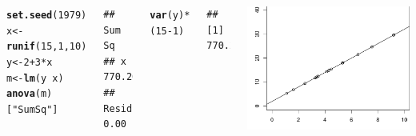\documentclass{beamer}\usepackage[]{graphicx}\usepackage[]{color}
\makeatletter
\newcommand{\hlnum}[1]{\textcolor[rgb]{0.686,0.059,0.569}{#1}}%
\newcommand{\hlstr}[1]{\textcolor[rgb]{0.192,0.494,0.8}{#1}}%
\newcommand{\hlopt}[1]{\textcolor[rgb]{0,0,0}{#1}}%
\newcommand{\hlstd}[1]{\textcolor[rgb]{0.345,0.345,0.345}{#1}}%
\newcommand{\hlkwb}[1]{\textcolor[rgb]{0.69,0.353,0.396}{#1}}%
\newcommand{\hlkwd}[1]{\textcolor[rgb]{0.737,0.353,0.396}{\textbf{#1}}}%
\newenvironment{kframe}{%
 \def\at@end@of@kframe{}%
 \ifinner\ifhmode%
  \def\at@end@of@kframe{\end{minipage}}%
  \begin{minipage}{\columnwidth}%
 \fi\fi%
 \def\FrameCommand##1{\hskip\@totalleftmargin \hskip-\fboxsep
 \colorbox{shadecolor}{##1}\hskip-\fboxsep
     \hskip-\linewidth \hskip-\@totalleftmargin \hskip\columnwidth}%
 \MakeFramed {\advance\hsize-\width
   \@totalleftmargin\z@ \linewidth\hsize
   \@setminipage}}%
 {\par\unskip\endMakeFramed%
 \at@end@of@kframe}
\newenvironment{knitrout}{}{} %
\renewenvironment{knitrout}{\setlength{\topsep}{0mm}}{}
\makeatother
\begin{document}
\begin{frame}[fragile]

\begin{columns}[c]


\begin{knitrout}\tiny
{}\color{fgcolor}\begin{kframe}
\begin{alltt}
\hlkwd{set.seed}\hlstd{(}\hlnum{1979}\hlstd{)}
\hlstd{x} \hlkwb{<-} \hlkwd{runif}\hlstd{(}\hlnum{15}\hlstd{,}\hlnum{1}\hlstd{,}\hlnum{10}\hlstd{)}
\hlstd{y} \hlkwb{<-} \hlnum{2} \hlopt{+} \hlnum{3}\hlopt{*}\hlstd{x}
\hlstd{m} \hlkwb{<-} \hlkwd{lm}\hlstd{(y} \hlopt{~} \hlstd{x)}
\hlkwd{anova}\hlstd{(m)[}\hlstr{"Sum Sq"}\hlstd{]}
\end{alltt}
\begin{verbatim}
##           Sum Sq
## x         770.26
## Residuals   0.00
\end{verbatim}
\begin{alltt}
\hlkwd{var}\hlstd{(y)}\hlopt{*}\hlstd{(}\hlnum{15}\hlopt{-}\hlnum{1}\hlstd{)}
\end{alltt}
\begin{verbatim}
## [1] 770.2641
\end{verbatim}
\end{kframe}
\end{knitrout}

\begin{knitrout}\tiny
{}\color{fgcolor}
\includegraphics[width=0.7\linewidth]{figure/sse0plot-1} 

\end{knitrout}



\end{columns}
\end{frame}
\end{document}
